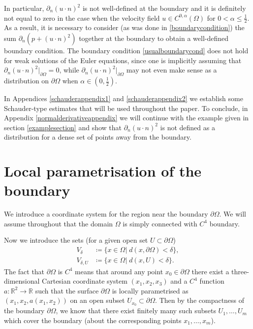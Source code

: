 \documentclass[12pt,a4paper]{article}
\theoremstyle{definition}
\theoremstyle{remark}
\numberwithin{equation}{section}
\begin{document}
In particular, $\partial_n (u \cdot n)^2$ is not well-defined at the boundary and it is definitely not equal to zero in the case when the velocity field $u\in C^{0,\alpha} (\Omega)$ for $0 < \alpha \leq \frac{1}{2}$. As a result, it is necessary to consider (as was done in \eqref{boundarycondition}) the sum $\partial_n (p + (u \cdot n)^2)$ together at the boundary to obtain a well-defined boundary condition. The boundary condition \eqref{usualboundarycond} does not hold for weak solutions of the Euler equations, since one is implicitly assuming that $\partial_n (u \cdot n)^2 \big\lvert_{\partial \Omega} = 0$, while $\partial_n (u \cdot n)^2 \big\lvert_{\partial \Omega}$ may not even make sense as a distribution on $\partial \Omega$ when $\alpha \in (0, \frac{1}{2})$.

In Appendices \ref{schauderappendix1} and \ref{schauderappendix2} we establish some Schauder-type estimates that will be used throughout the paper. To conclude, in Appendix \ref{normalderivativeappendix} we will continue with the example given in section \ref{examplesection} and show that $\partial_n (u \cdot n)^2$ is not defined as a distribution for a dense set of points away from the boundary. 

\section{Local parametrisation of the boundary} \label{parametrisationsection}
We introduce a coordinate system for the region near the boundary $\partial \Omega$. We will assume throughout that the domain $\Omega$ is simply connected with $C^4$ boundary. 

Now we introduce the sets (for a given open set $U \subset \partial \Omega$)
\begingroup
\allowdisplaybreaks
\begin{align}
V_\delta &\coloneqq \{ x \in \Omega \lvert \; d(x, \partial \Omega) < \delta \}, \label{Vdeltadef} \\
V_{\delta , U} &\coloneqq  \{ x \in \Omega \lvert \; d(x, U) < \delta \}.
\end{align}
\endgroup
The fact that $\partial \Omega$ is $C^4$ means that around any point $x_0 \in \partial \Omega$ there exist a three-dimensional Cartesian coordinate system $(x_1, x_2, x_3)$ and a $C^4$ function $a : \mathbb{R}^2 \rightarrow \mathbb{R}$ such that the surface $\partial \Omega$ is locally parametrised as $(x_1, x_2, a (x_1, x_2) )$ on an open subset $U_{x_0} \subset \partial \Omega$. Then by the compactness of the boundary $\partial \Omega$, we know that there exist finitely many such subsets $U_1, \ldots, U_m$ which cover the boundary (about the corresponding points $x_1, \ldots, x_m$). 
\end{document}
